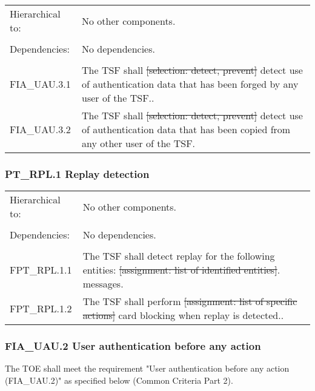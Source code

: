 \documentclass[10pt,titlepage]{article}
\begin{document}
\begin{table}[!ht]
	\begin{tabular}{ p{3cm}  p{10cm} }
			Hierarchical to:& No other components. \\ 
									&\\
			Dependencies: & No dependencies.\\
									&\\
			FIA\_UAU.3.1	& The TSF shall \sout{[selection: detect, prevent]} detect use of authentication data that
       	has been forged by any user of the TSF..\\
       	FIA\_UAU.3.2 & The TSF shall \sout{[selection: detect, prevent]} detect use of authentication data that
       	has been copied from any other user of the TSF.\\

	 \end{tabular}
 \end{table}
 
 \subsubsection{PT\_RPL.1 Replay detection}
 
 \begin{table}[!ht]
	\begin{tabular}{ p{3cm}  p{10cm} }
			Hierarchical to:& No other components. \\ 
									&\\
			Dependencies: & No dependencies.\\
									&\\
		FPT\_RPL.1.1	& The TSF shall detect replay for the following entities: \sout{[assignment: list of
       	identified entities]}. messages.\\
       FPT\_RPL.1.2 & The TSF shall perform \sout{[assignment: list of specific actions]} card blocking when replay is detected..\\

	 \end{tabular}
 \end{table}
 
 \subsubsection{FIA\_UAU.2 User authentication before any action}

The TOE shall meet the requirement "User authentication before any action (FIA\_UAU.2)" as specified below (Common Criteria Part 2).
\end{document}
